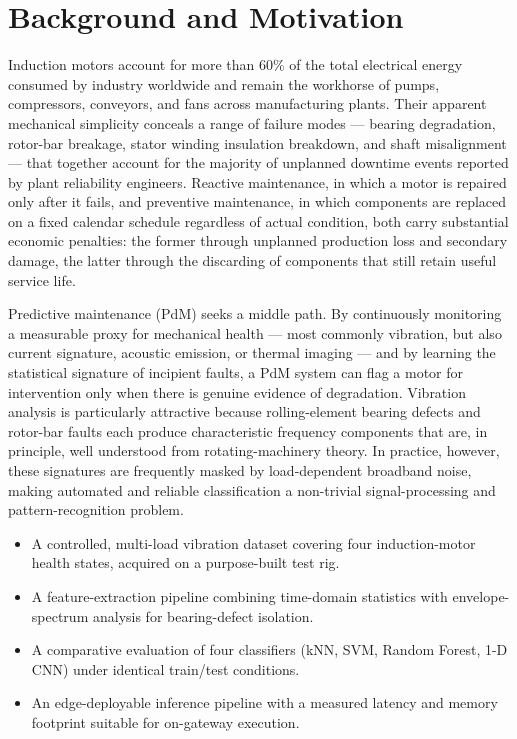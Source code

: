 \section{Background and Motivation}
Induction motors account for more than 60\% of the total electrical energy consumed by industry
worldwide and remain the workhorse of pumps, compressors, conveyors, and fans across
manufacturing plants. Their apparent mechanical simplicity conceals a range of failure modes ---
bearing degradation, rotor-bar breakage, stator winding insulation breakdown, and shaft
misalignment --- that together account for the majority of unplanned downtime events reported by
plant reliability engineers. Reactive maintenance, in which a motor is repaired only after it
fails, and preventive maintenance, in which components are replaced on a fixed calendar
schedule regardless of actual condition, both carry substantial economic penalties: the former
through unplanned production loss and secondary damage, the latter through the discarding of
components that still retain useful service life.

Predictive maintenance (PdM) seeks a middle path. By continuously monitoring a measurable proxy
for mechanical health --- most commonly vibration, but also current signature, acoustic
emission, or thermal imaging --- and by learning the statistical signature of incipient faults,
a PdM system can flag a motor for intervention only when there is genuine evidence of
degradation. Vibration analysis is particularly attractive because rolling-element bearing
defects and rotor-bar faults each produce characteristic frequency components that are, in
principle, well understood from rotating-machinery theory. In practice, however, these
signatures are frequently masked by load-dependent broadband noise, making automated and
reliable classification a non-trivial signal-processing and pattern-recognition problem.

\begin{tcolorbox}[keybox,title={Key Contributions of this Thesis}]
\begin{itemize}
  \item A controlled, multi-load vibration dataset covering four induction-motor health states,
        acquired on a purpose-built test rig.
  \item A feature-extraction pipeline combining time-domain statistics with envelope-spectrum
        analysis for bearing-defect isolation.
  \item A comparative evaluation of four classifiers (kNN, SVM, Random Forest, 1-D CNN) under
        identical train/test conditions.
  \item An edge-deployable inference pipeline with a measured latency and memory footprint
        suitable for on-gateway execution.
\end{itemize}
\end{tcolorbox}
